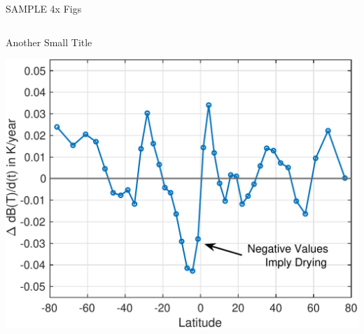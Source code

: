 \documentclass[10pt,t]{beamer}
\begin{document}
\begin{frame}[label={sec:orgd2a29c0}]{SAMPLE 4x Figs}
\begin{columns}
\begin{column}{0.45\columnwidth}
\begin{block}{\footnotesize Another Small Title}
\vspace{-0.1in}
\begin{center}
\includegraphics[width=\linewidth]{./Figs/Pdf/drying_in_convective_regions_v2.pdf}
\end{center}
\end{block}
\end{column}
\end{columns}
\end{frame}
\end{document}
